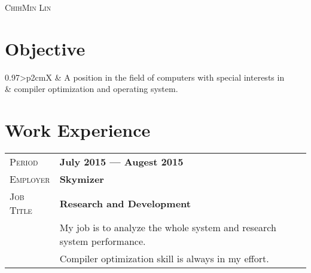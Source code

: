 \documentclass[amsart, a4paper, oneside, final]{scrartcl} %
\newcommand{\gray}{\rowcolor[gray]{.90}} %
\begin{document}
\begin{center} %


{\fontsize{36}{36}\selectfont\scshape ChihMin Lin} %

\vspace{1.5cm} %


\section{Objective}

\begin{tabularx}{0.97\linewidth}{>{\raggedleft\scshape}p{2cm}X}
& A position in the field of computers with special interests in\\
& compiler optimization and operating system.
\end{tabularx}


\section{Work Experience}

\begin{tabularx}{0.97\linewidth}{>{\raggedleft\scshape}p{2cm}X}
\gray Period & \textbf{July 2015 --- Augest 2015}\\
\gray Employer & \textbf{Skymizer}\\
\gray Job Title & \textbf{Research and Development}\\
& My job is to analyze the whole system and research system performance.\\
& Compiler optimization skill is always in my effort.
\end{tabularx}

\vspace{12pt}


\end{center}
\end{document}
